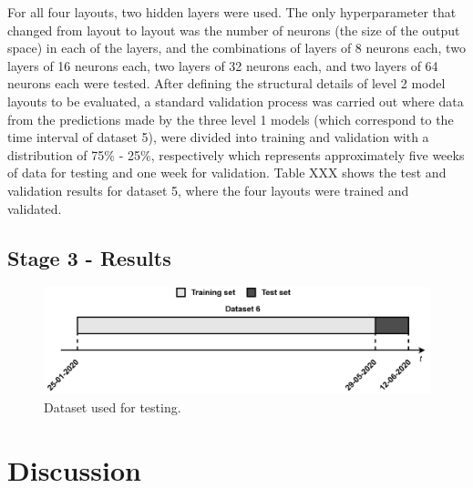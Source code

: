 For all four layouts, two hidden layers were used. The only hyperparameter that changed from layout to layout was the number of neurons (the size of the output space) in each of the layers, and the combinations of layers of 8 neurons each, two layers of 16 neurons each, two layers of 32 neurons each, and two layers of 64 neurons each were tested. After defining the structural details of level 2 model layouts to be evaluated, a standard validation process was carried out where data from the predictions made by the three level 1 models (which correspond to the time interval of dataset 5), were divided into training and validation with a distribution of 75\% - 25\%, respectively which represents approximately five weeks of data for testing and one week for validation. Table XXX shows the test and validation results for dataset 5, where the four layouts were trained and validated.









\subsection{Stage 3 - Results}

\begin{figure}[h!]
    \centering
    \begin{center}
    \includegraphics[width=1\textwidth]{Images/Test.png}
    \caption{Dataset used for testing.}
    \label{test}
    \end{center}
\end{figure}

\section{Discussion}


